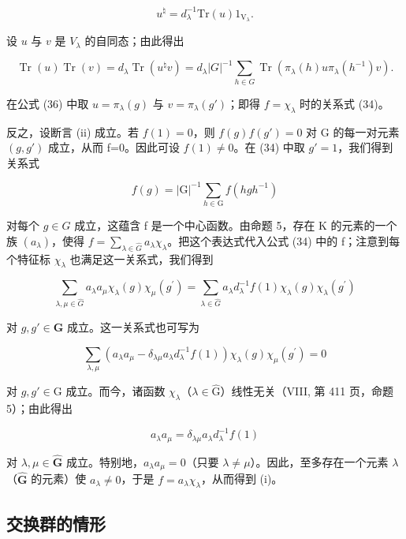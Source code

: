 \[
u ^ {\natural} = d _ {\lambda} ^ {- 1} \mathrm{Tr} (u) 1 _ {\mathrm{V} _ {\lambda}}.
\]

设 \(u\) 与 \(v\) 是 \(V_{\lambda}\) 的自同态；由此得出

\[
\operatorname{Tr} (u) \operatorname{Tr} (v) = d _ {\lambda} \operatorname{Tr} (u ^ {\natural} v) = d _ {\lambda} | G | ^ {- 1} \sum_ {h \in G} \operatorname{Tr} (\pi_ {\lambda} (h) u \pi_ {\lambda} (h ^ {- 1}) v).\tag{36}
\]

在公式 (36) 中取 \(u = \pi_{\lambda}(g)\) 与 \(v = \pi_{\lambda}(g')\)；即得 \(f = \chi_{\lambda}\) 时的关系式 (34)。

反之，设断言 (ii) 成立。若 \(f(1)=0\)，则 \(f(g)f(g')=0\) 对 G 的每一对元素 \((g,g')\) 成立，从而 f=0。因此可设 \(f(1)\neq0\)。在 (34) 中取 \(g'=1\)，我们得到关系式

\[
f (g) = | \mathrm{G} | ^ {- 1} \sum_ {h \in \mathrm{G}} f (h g h ^ {- 1})
\]

对每个 \(g \in G\) 成立，这蕴含 f 是一个中心函数。由命题 5，存在 K 的元素的一个族 \((a_{\lambda})\)，使得 \(f = \sum_{\lambda \in \widehat{G}} a_{\lambda} \chi_{\lambda}\)。把这个表达式代入公式 (34) 中的 f；注意到每个特征标 \(\chi_{\lambda}\) 也满足这一关系式，我们得到

\[
\sum_ {\lambda , \mu \in \widehat {G}} a _ {\lambda}   a _ {\mu}   \chi_ {\lambda} (g)   \chi_ {\mu} (g ^ {\prime}) = \sum_ {\lambda \in \widehat {G}} a _ {\lambda}   d _ {\lambda} ^ {- 1}   f (1)   \chi_ {\lambda} (g)   \chi_ {\lambda} (g ^ {\prime})\tag{37}
\]

对 \(g, g' \in \mathbf{G}\) 成立。这一关系式也可写为

\[
\sum_ {\lambda , \mu} (a _ {\lambda} a _ {\mu} - \delta_ {\lambda \mu} a _ {\lambda} d _ {\lambda} ^ {- 1} f (1)) \chi_ {\lambda} (g) \chi_ {\mu} (g ^ {\prime}) = 0\tag{38}
\]

对 \(g, g' \in \mathrm{G}\) 成立。而今，诸函数 \(\chi_{\lambda}\)（\(\lambda \in \widehat{\mathrm{G}}\)）线性无关（VIII, 第 411 页，命题 5）；由此得出

\[
a _ {\lambda} a _ {\mu} = \delta_ {\lambda \mu} a _ {\lambda} d _ {\lambda} ^ {- 1} f (1)
\]

对 \(\lambda, \mu \in \widehat{\mathbf{G}}\) 成立。特别地，\(a_{\lambda}a_{\mu} = 0\)（只要 \(\lambda \neq \mu\)）。因此，至多存在一个元素 \(\lambda\)（\(\widehat{\mathbf{G}}\) 的元素）使 \(a_{\lambda} \neq 0\)，于是 \(f = a_{\lambda}\chi_{\lambda}\)，从而得到 (i)。

\subsection{交换群的情形}

